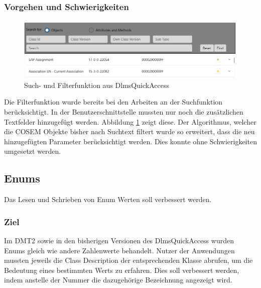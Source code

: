 \subsubsection{Vorgehen und Schwierigkeiten}
\begin{figure}
   \centering
   \includegraphics[width=1.0\textwidth]{gfx/searchfilter.png}
   \caption{
      Such- und Filterfunktion aus DlmsQuickAccess 
      }
      \label{fig:searchfilterUIRel}
\end{figure}
Die Filterfunktion wurde bereits bei den Arbeiten an der Suchfunktion berücksichtigt.
In der Benutzerschnittstelle mussten nur noch die zusätzlichen Textfelder hinzugefügt werden.
Abbildung \ref{fig:searchfilterUIRel} zeigt diese.
Der Algorithmus, welcher die \ac{COSEM} Objekte bisher nach Suchtext filtert wurde so erweitert, dass die neu hinzugefügten Parameter berücksichtigt werden.
Dies konnte ohne Schwierigkeiten umgesetzt werden.



\subsection{Enums}
\dq Das Lesen und Schrieben von Enum Werten soll verbessert werden.\dq
\subsubsection{Ziel}
Im \ac{DMT2} sowie in den bisherigen Versionen des DlmsQuickAccess wurden Enums gleich wie andere Zahlenwerte behandelt.
Nutzer der Anwendungen mussten jeweils die Class Description der entsprechenden Klasse abrufen, um die Bedeutung eines bestimmten Werts zu erfahren.
Dies soll verbessert werden, indem anstelle der Nummer die dazugehörige Bezeichnung angezeigt wird.

